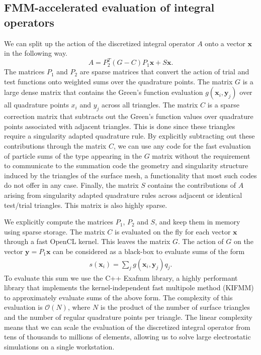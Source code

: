 \subsection{FMM-accelerated evaluation of integral operators}
We can split up the action of the discretized integral operator $A$ onto a vector $\mathbf{x}$ in the following way.
$$
A = P_2^T (G - C)P_1 \mathbf{x} + S \mathbf{x}.
$$
The matrices $P_1$ and $P_2$ are sparse matrices that convert the action of trial and test functions onto weighted sums over the quadrature points.
The matrix $G$ is a large dense matrix that contains the Green's function evaluation $g(\mathbf{x}_i, \mathbf{y}_j)$ over all quadrature points $x_i$ and $y_j$ across all triangles.
The matrix $C$ is a sparse correction matrix that subtracts out the Green's function values over quadrature points associated with  adjacent triangles.
This is done since these triangles require a singularity adapted quadrature rule.
By explicitly subtracting out these contributions through the matrix $C$, we can use any code for the fast evaluation of particle sums of the type appearing in the $G$ matrix without the requirement to communicate to the summation code the geometry and singularity structure induced by the triangles of the surface mesh, a functionality that most such codes do not offer in any case.
Finally, the matrix $S$ contains the contributions of $A$ arising from singularity adapted quadrature rules across adjacent or identical test/trial triangles.
This matrix is also highly sparse.

We explicitly compute the matrices $P_1$, $P_2$ and $S$, and keep them in memory using sparse storage.
The matrix $C$ is evaluated on the fly for each vector $\mathbf{x}$ through a fast OpenCL kernel.
This leaves the matrix $G$.
The action of $G$ on the vector $\mathbf{y}=P_1 \mathbf{x}$ can be considered as a black-box to evaluate sums of the form
%
\begin{align}\label{eq:nbody_sum}
s(\mathbf{x}_i) = \sum_j g(\mathbf{x}_i, \mathbf{y}_j)q_j.
\end{align}
%
To evaluate this sum we use the C++ Exafmm library, a highly performant library that implements the kernel-independent fast multipole method (KIFMM) to approximately evaluate sums of the above form.
The complexity of this evaluation is $\mathcal{O}(N)$, where $N$ is the product of the number of surface triangles and the number of regular quadrature points per triangle.
The linear complexity means that we can scale the evaluation of the discretized integral operator from tens of thousands to millions of elements, allowing us to solve large  electrostatic simulations on a single workstation.
